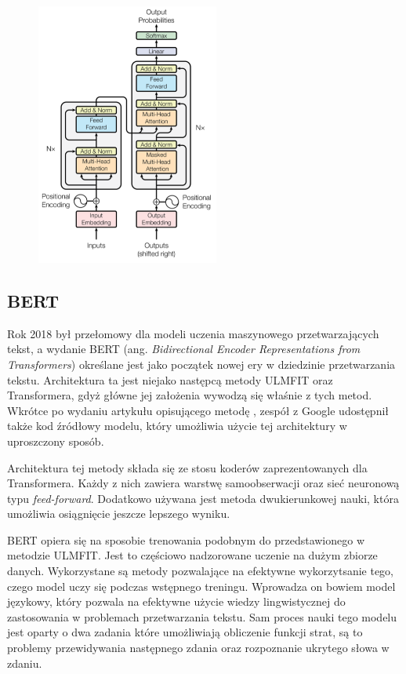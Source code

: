 \begin{figure}[t]
\centering\includegraphics[width=6cm]{figures/attention_transformer.png}
\label{rys:attention_transformer}
\end{figure}

\subsection{BERT}

Rok 2018 był przełomowy dla modeli uczenia maszynowego przetwarzających tekst, a wydanie BERT (ang. \textit{Bidirectional Encoder Representations from
Transformers}) określane jest jako początek nowej ery w dziedzinie przetwarzania tekstu. Architektura ta jest niejako następcą metody ULMFIT oraz Transformera, gdyż główne jej założenia wywodzą się właśnie z tych metod. Wkrótce po wydaniu artykułu opisującego metodę \cite{devlin2018bert}, zespół z Google udostępnił także kod źródłowy modelu, który umożliwia użycie tej architektury w uproszczony sposób. 

Architektura tej metody składa się ze stosu koderów zaprezentowanych dla Transformera. Każdy z nich zawiera warstwę samoobserwacji oraz sieć neuronową typu \textit{feed-forward}. Dodatkowo używana jest metoda dwukierunkowej nauki, która umożliwia osiągnięcie jeszcze lepszego wyniku.

BERT opiera się na sposobie trenowania podobnym do przedstawionego w metodzie ULMFIT. Jest to częściowo nadzorowane uczenie na dużym zbiorze danych. Wykorzystane są metody pozwalające na efektywne wykorzytsanie tego, czego model uczy się podczas wstępnego treningu. Wprowadza on bowiem model językowy, który pozwala na efektywne użycie wiedzy lingwistycznej do zastosowania w problemach przetwarzania tekstu. Sam proces nauki tego modelu jest oparty o dwa zadania które umożliwiają obliczenie funkcji strat, są to problemy przewidywania następnego zdania oraz rozpoznanie ukrytego słowa w zdaniu.

